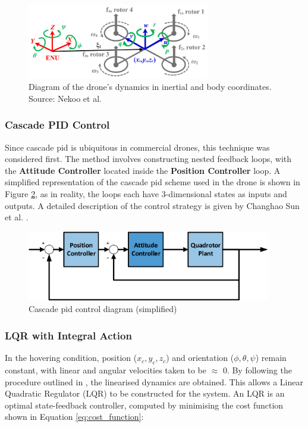 \begin{figure}[H]
\centering
\includegraphics[width=0.71\textwidth]{figs/Samuel/Figures/nekoo1-0005-large.png}
\caption{Diagram of the drone's dynamics in inertial and body coordinates. Source: Nekoo et al. \cite{nekoo}}
\label{fig:nekoodiag}
\end{figure}

\subsubsection{Cascade PID Control}
Since cascade \gls{pid} is ubiquitous in commercial drones, this technique was considered first. The method involves constructing nested feedback loops, with the \textbf{Attitude Controller} located inside the \textbf{Position Controller} loop. A simplified representation of the cascade \gls{pid} scheme used in the drone is shown in Figure \ref{fig:pidloop}, as in reality, the loops each have 3-dimensional states as inputs and outputs. A detailed description of the control strategy is given by Changhao Sun et al. \cite{electronics10040376}.

\begin{figure}[H]
\centering
\includegraphics[width=0.95\textwidth]{figs/Samuel/Figures/Control Loop-cropped.pdf}
\caption{Cascade \gls{pid} control diagram (simplified)}
\label{fig:pidloop}
\end{figure}




\subsubsection{LQR with Integral Action}
\label{sec:symbs}

In the hovering condition, position (\(x_c, y_c, z_c\)) and orientation (\(\phi, \theta, \psi\)) remain constant, with linear and angular velocities taken to be $\approx$ 0. By following the procedure outlined in \cite{cengiz2024quadcopter}, the linearised dynamics are obtained. This allows a Linear Quadratic Regulator (LQR) to be constructed for the system. An LQR is an optimal state-feedback controller, computed by minimising the cost function shown in Equation \ref{eq:cost_function}:

